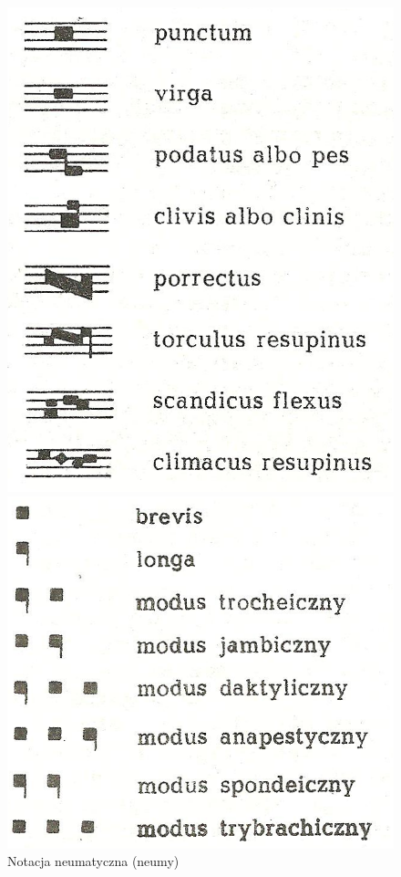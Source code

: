 \documentclass[polish,thesis,12pt]{dcsbook}
\begin{document}
\begin{figure}[H]
  \centering
  \begin{minipage}[t]{0.45\textwidth}
    \includegraphics[scale=1.5,bb=0 0 148 185]{img/notacja neumatyczna.png}
    \caption{Notacja neumatyczna (neumy)~\cite{Reiss}}
    \label{notacja_neumatyczna}
  \end{minipage}
  \quad
  \begin{minipage}[t]{0.45\textwidth}
    \includegraphics[scale=1.6,bb=0 0 154 140]{img/notacja modalna.png}

\end{minipage}
\end{figure}
\end{document}
